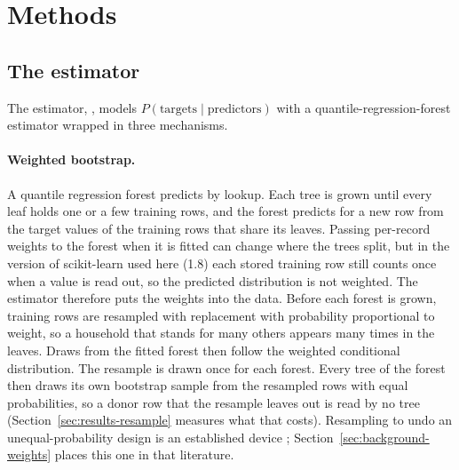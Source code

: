 \section{Methods}

\subsection{The estimator}
\label{sec:estimator}

The estimator, \populacefit{}, models $P(\text{targets} \mid \text{predictors})$ with a
quantile-regression-forest estimator \citep{meinshausen2006quantile,
johnson2024quantile} wrapped in three mechanisms.

\paragraph{Weighted bootstrap.} A quantile regression forest predicts by
lookup. Each tree is grown until every leaf holds one or a few training
rows, and the forest predicts for a new row from the target values of the
training rows that share its leaves. Passing per-record weights to the
forest when it is fitted can change where the trees
split, but in the version of scikit-learn used here (1.8) each stored
training row still counts once when a value is read out, so the predicted
distribution is not weighted. The estimator therefore
puts the weights into the data. Before each forest is grown, training rows
are resampled with replacement with probability proportional to weight, so a
household that stands for many others appears many times in the leaves.
Draws from the fitted forest then follow the weighted conditional
distribution. The resample is drawn once for each forest. Every tree of the
forest then draws its own bootstrap sample from the resampled rows with
equal probabilities, so a donor row that the resample leaves out is read by
no tree (Section~\ref{sec:results-resample} measures what that costs).
Resampling to undo an
unequal-probability design is an established device
\citep{hinkins1997inverse, dong2014nonparametric}; Section~\ref{sec:background-weights}
places this one in that literature.

